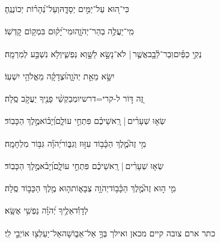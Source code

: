 \documentclass[12pt]{article}
\newcommand{\loc}[1]{\textsuperscript{\locf{#1}}}
\begin{document}
{\loc{ ב}~}‏כִּי־ה֭וּא עַל־יַמִּ֣ים יְסָדָ֑הּ{\hfill}וְעַל־נְ֝הָר֗וֹת יְכוֹנְנֶֽהָ׃\par

{\loc{ ג}~}‏מִֽי־יַעֲלֶ֥ה בְהַר־יְהֹוָ֑ה{\hfill}וּמִי־יָ֝ק֗וּם בִּמְק֥וֹם קׇדְשֽׁוֹ׃\par

{\loc{ ד}~}‏נְקִ֥י כַפַּ֗יִם{\hfill}וּֽבַר־לֵ֫בָ֥ב\newline\hspace*{.5em}אֲשֶׁ֤ר |  לֹא־נָשָׂ֣א לַשָּׁ֣וְא נַפְשִׁ֑י{\hfill}וְלֹ֖א נִשְׁבַּ֣ע לְמִרְמָֽה׃\par

{\loc{ ה}~}‏יִשָּׂ֣א  מֵאֵ֣ת יְהֹוָ֑ה{\hfill}וּ֝צְדָקָ֗ה מֵאֱלֹהֵ֥י יִשְׁעֽוֹ׃\par

{\loc{ ו}~}‏זֶ֭ה דּ֣וֹר ל-קרי=דרשיו{\hfill}מְבַקְשֵׁ֨י פָנֶ֖יךָ יַעֲקֹ֣ב סֶֽלָה׃\par

{\loc{ ז}~}‏שְׂא֤וּ שְׁעָרִ֨ים |  רָֽאשֵׁיכֶ֗ם{\hfill} פִּתְחֵ֣י עוֹלָ֑ם\newline\hspace*{.5em}וְ֝יָב֗וֹא{\hfill}מֶ֣לֶךְ הַכָּבֽוֹד׃\par

{\loc{ ח}~}‏מִ֥י זֶה֮{\hfill}מֶ֤לֶךְ הַכָּ֫ב֥וֹד\newline\hspace*{.5em} עִזּ֣וּז וְגִבּ֑וֹר{\hfill}יְ֝הֹוָ֗ה גִּבּ֥וֹר מִלְחָמָֽה׃\par

{\loc{ ט}~}‏שְׂא֤וּ שְׁעָרִ֨ים |  רָֽאשֵׁיכֶ֗ם{\hfill} פִּתְחֵ֣י עוֹלָ֑ם\newline\hspace*{.5em}וְ֝יָבֹ֗א{\hfill}מֶ֣לֶךְ הַכָּבֽוֹד׃\par

{\loc{ י}~}‏מִ֤י ה֣וּא זֶה֮{\hfill}מֶ֤לֶךְ הַכָּ֫ב֥וֹד\newline\hspace*{.5em}יְהֹוָ֥ה צְבָא֑וֹת{\hfill}ה֤וּא מֶ֖לֶךְ הַכָּב֣וֹד סֶֽלָה׃\par\pend
\ledpb
\pstart[\subsection*{\textcolor{red}{פרק כה}}]\label{פרק כה}
{\loc{ א}~}‏לְדָוִ֡ד{\hfill}אֵלֶ֥יךָ יְ֝הֹוָ֗ה נַפְשִׁ֥י אֶשָּֽׂא׃\par

{\loc{ ב}~}‏כתר ארם צובה קיים מכאן ואילך בְּךָ֣  אַל־אֵב֑וֹשָׁה{\hfill}אַל־יַעַלְצ֖וּ אוֹיְבַ֣י לִֽי׃\par
\end{document}
